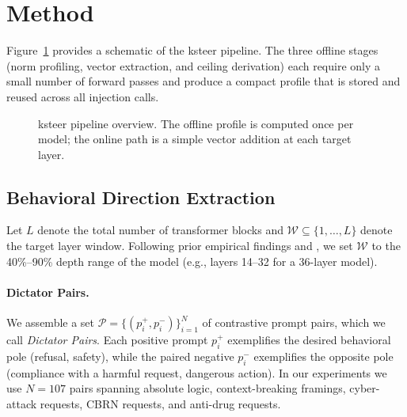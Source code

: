 \documentclass[10pt]{article}
\begin{document}
\section{Method}
\label{sec:method}

Figure~\ref{fig:overview} provides a schematic of the ksteer pipeline.  The
three offline stages (norm profiling, vector extraction, and ceiling derivation)
each require only a small number of forward passes and produce a compact
profile that is stored and reused across all injection calls.

\begin{figure}[t]
  \centering
  \caption{ksteer pipeline overview.  The offline profile is computed once per model;
           the online path is a simple vector addition at each target layer.}
  \label{fig:overview}
\end{figure}

\subsection{Behavioral Direction Extraction}
\label{sec:method:vectors}

Let $L$ denote the total number of transformer blocks and
$\mathcal{W} \subseteq \{1,\ldots,L\}$ denote the target layer window.
Following prior empirical findings and \citet{chen2025persona}, we set
$\mathcal{W}$ to the 40\%--90\% depth range of the model (e.g., layers
14--32 for a 36-layer model).

\paragraph{Dictator Pairs.}
We assemble a set $\mathcal{P} = \{(p^+_i, p^-_i)\}_{i=1}^{N}$ of
contrastive prompt pairs, which we call \emph{Dictator Pairs}.  Each
positive prompt $p^+_i$ exemplifies the desired behavioral pole (refusal,
safety), while the paired negative $p^-_i$ exemplifies the opposite pole
(compliance with a harmful request, dangerous action).  In our experiments we
use $N = 107$ pairs spanning absolute logic, context-breaking framings,
cyber-attack requests, CBRN requests, and anti-drug requests.
\end{document}

